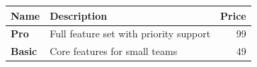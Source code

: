 \begin{table}[htbp]
\centering
\begin{tabular}{>{\bfseries}l>{\raggedright\arraybackslash}p{4cm}r}
\toprule
Name & Description & Price \\
\midrule
Pro & Full feature set with priority support & 99 \\
Basic & Core features for small teams & 49 \\
\bottomrule
\end{tabular}
\end{table}
